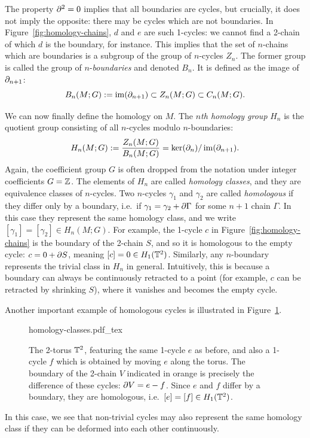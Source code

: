 The property $\partial^2 = 0$ implies that all boundaries are cycles, but crucially, it does not imply the opposite: there may be cycles which are not boundaries. In Figure~\ref{fig:homology-chains}, $d$ and $e$ are such 1-cycles: we cannot find a 2-chain of which $d$ is the boundary, for instance. This implies that the set of $n$-chains which are boundaries is a subgroup of the group of $n$-cycles $Z_n$. The former group is called the group of $n$-\emph{boundaries} and denoted $B_n$. It is defined as the image of $\partial_{n+1}$:
\begin{equation*}
	B_n(M;G) := \operatorname{im}(\partial_{n+1}) \subset Z_n(M;G) \subset C_n(M;G).
\end{equation*}

We can now finally define the homology on $M$. The \emph{$n$th homology group} $H_n$ is the quotient group consisting of all $n$-cycles modulo $n$-boundaries:
\begin{equation*}
	H_n(M;G) := \frac{Z_n(M;G)}{B_n(M;G)} = \ker(\partial_n) / \operatorname{im}(\partial_{n+1}).
\end{equation*}
Again, the coefficient group $G$ is often dropped from the notation under integer coefficients $G=\mathbb{Z}$. The elements of $H_n$ are called \emph{homology classes}, and they are equivalence classes of $n$-cycles. Two $n$-cycles $\gamma_1$ and $\gamma_2$ are called \emph{homologous} if they differ only by a boundary, i.e.\ if $\gamma_1 = \gamma_2 + \partial\Gamma$ for some $n+1$ chain $\Gamma$. In this case they represent the same homology class, and we write $[\gamma_1] = [\gamma_2]\in H_n(M;G)$. For example, the 1-cycle $c$ in Figure~\ref{fig:homology-chains} is the boundary of the 2-chain $S$, and so it is homologous to the empty cycle: $c= 0 + \partial S$, meaning $[c] = 0\in H_1(\mathbb{T}^2)$. Similarly, any $n$-boundary represents the trivial class in $H_n$ in general. Intuitively, this is because a boundary can always be continuously retracted to a point (for example, $c$ can be retracted by shrinking $S$), where it vanishes and becomes the empty cycle.

Another important example of homologous cycles is illustrated in Figure~\ref{fig:homology-classes}.
\begin{figure}[htb!]
	\centering
	\def\svgwidth{.6\linewidth}
	{homology-classes.pdf_tex}
	\caption{The 2-torus $\mathbb{T}^2$, featuring the same 1-cycle $e$ as before, and also a 1-cycle $f$ which is obtained by moving $e$ along the torus. The boundary of the 2-chain $V$ indicated in orange is precisely the difference of these cycles: $\partial V = e - f$. Since $e$ and $f$ differ by a boundary, they are homologous, i.e.\ $[e]=[f]\in H_1(\mathbb{T}^2)$.}
	\label{fig:homology-classes}
\end{figure}
In this case, we see that non-trivial cycles may also represent the same homology class if they can be deformed into each other continuously.

